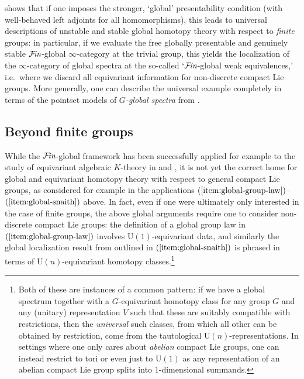 \documentclass[reqno]{memo-l}
\theoremstyle{mythm}
\theoremstyle{definition}
\numberwithin{equation}{section}
\newcommand{\Fin}{\hbox{$\mathcal F\kern-1.7pt\textit{in}$}}
\begin{document}
\cite{CLL_Global} shows that if one imposes the stronger, `global' presentability condition (with well-behaved left adjoints for all homomorphisms), this leads to universal descriptions of unstable and stable global homotopy theory with respect to \emph{finite} groups: in particular, if we evaluate the free globally presentable and genuinely stable $\Fin$-global $\infty$-category at the trivial group, this yields the localization of the $\infty$-category of global spectra at the so-called `$\Fin$-global weak equivalences,' i.e.\ where we discard all equivariant information for non-discrete compact Lie groups. More generally, one can describe the universal example completely in terms of the pointset models of \emph{$G$-global spectra} from \cite{g-global}.

\subsection*{Beyond finite groups}
While the $\Fin$-global framework has been successfully applied for example to the study of equivariant algebraic $K$-theory in \cite{swan} and \cites{CHLL_NRings,LLP}, it is not yet the correct home for global and equivariant homotopy theory with respect to general compact Lie groups, as considered for example in the applications $(\ref{item:global-group-law})$--$(\ref{item:global-snaith})$ above. In fact, even if one were ultimately only interested in the case of finite groups, the above global arguments require one to consider non-discrete compact Lie groups: the definition of a global group law in $(\ref{item:global-group-law})$ involves $\text{U}(1)$-equivariant data, and similarly the global localization result from \cite{schwede2025snaith} outlined in $(\ref{item:global-snaith})$ is phrased in terms of $\text{U}(n)$-equivariant homotopy classes.\footnote{Both of these are instances of a common pattern: if we have a global spectrum together with a $G$-equivariant homotopy class for any group $G$ and any (unitary) representation $V$ such that these are suitably compatible with restrictions, then the \emph{universal} such classes, from which all other can be obtained by restriction, come from the tautological $\text{U}(n)$-representations. In settings where one only cares about \emph{abelian} compact Lie groups, one can instead restrict to tori or even just to $\text{U}(1)$ as any representation of an abelian compact Lie group splits into 1-dimensional summands.}
\end{document}
